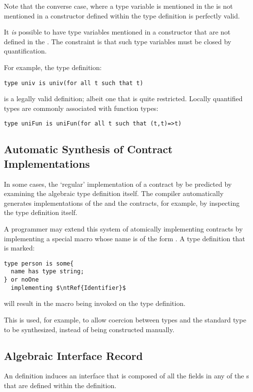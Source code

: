 \begin{aside}
Note that the converse case, where a type variable is mentioned in the  is not mentioned in a constructor defined within the type definition is perfectly valid.
\end{aside}

It \emph{is} possible to have type variables mentioned in a constructor that are not defined in the . The constraint is that such type variables must be closed by quantification.

For example, the type definition:
\begin{lstlisting}
type univ is univ(for all t such that t)
\end{lstlisting}
is a legally valid  definition; albeit one that is quite restricted. Locally quantified types are commonly associated with function types:
\begin{lstlisting}
type uniFun is uniFun(for all t such that (t,t)=>t)
\end{lstlisting}

\subsection{Automatic Synthesis of Contract Implementations}

In some cases, the `regular' implementation of a contract by be predicted by examining the algebraic type definition itself. The \Sr compiler automatically generates implementations of the  and the  contracts, for example, by inspecting the type definition itself.

A programmer may extend this system of atomically implementing contracts by implementing a special macro whose name is of the form . A type definition that is marked:
\begin{lstlisting}[mathescape=true]
type person is some{
  name has type string;
} or noOne 
  implementing $\ntRef{Identifier}$
\end{lstlisting}
will result in the macro  being invoked on the type definition. 

This is used, for example, to allow coercion between types and the standard  type to be synthesized, instead of being constructed manually.

\subsection{Algebraic Interface Record}
\label{algebraicInterface}
An  definition induces an interface that is composed of all the fields in any of the s that are defined within the definition.

